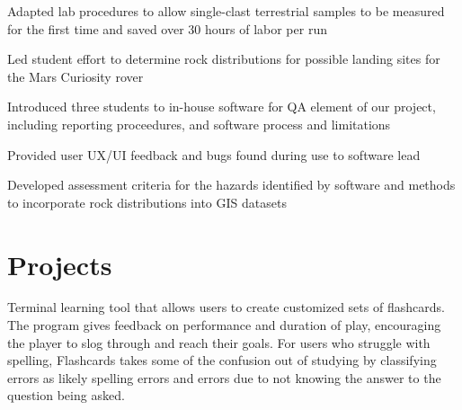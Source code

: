 \documentclass[letterpaper]{deedy-resume} %
\begin{document}
\begin{minipage}[t]{0.66\textwidth}
\begin{tightitemize}
\item Adapted lab procedures to allow single-clast terrestrial samples to be measured for the first time and saved over 30 hours of labor per run \\
\end{tightitemize}

\sectionspace %



\begin{tightitemize}
\item Led student effort to determine rock distributions for possible landing sites for the Mars Curiosity rover \\
\item Introduced three students to in-house software for QA element of our project, including reporting proceedures, and software process and limitations \\
\item Provided user UX/UI feedback and bugs found during use to software lead \\
\item Developed assessment criteria for the hazards identified by software and methods to incorporate rock distributions into GIS datasets \\
\end{tightitemize}

\sectionspace %


\section{Projects}

Terminal learning tool that allows users to create customized sets of flashcards.  The program gives feedback on performance and duration of play, encouraging the player to slog through and reach their goals.  For users who struggle with spelling, Flashcards takes some of the confusion out of studying by classifying errors as likely spelling errors and errors due to not knowing the answer to the question being asked. \\
\sectionspace %


\end{minipage}
\end{document}
